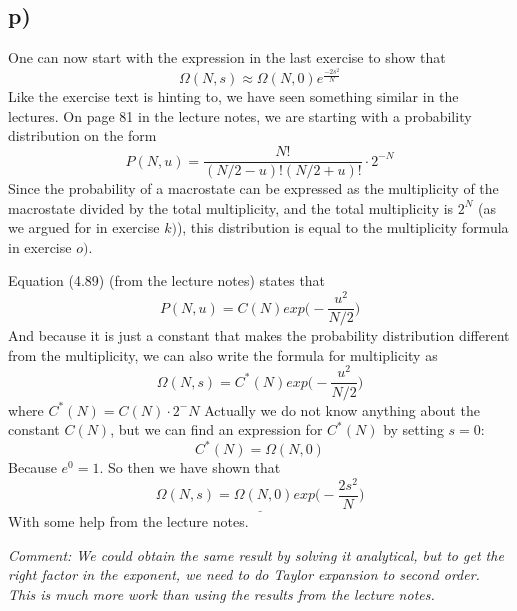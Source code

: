 \documentclass{scrartcl}
\begin{document}
\subsection*{p)}
One can now start with the expression in the last exercise to show that
$$\Omega(N,s)\approx\Omega(N,0)e^{\frac{-2s^2}{N}}$$
Like the exercise text is hinting to, we have seen something similar in the lectures. On page 81 in the lecture notes, we are starting with a probability distribution on the form
$$P(N,u)=\frac{N!}{(N/2-u)!(N/2+u)!}\cdot2^{-N}$$
Since the probability of a macrostate can be expressed as the multiplicity of the macrostate divided by the total multiplicity, and the total multiplicity is $2^N$ (as we argued for in exercise $k)$), this distribution is equal to the multiplicity formula in exercise $o)$.\par\vspace{3mm}
Equation (4.89) (from the lecture notes) states that 
$$P(N,u)=C(N)exp\bigg(-\frac{u^2}{N/2}\bigg)$$
And because it is just a constant that makes the probability distribution different from the multiplicity, we can also write the formula for multiplicity as
$$\Omega(N,s)=C^*(N)exp\bigg(-\frac{u^2}{N/2}\bigg)$$
where $C^*(N)=C(N)\cdot2^-N$
Actually we do not know anything about the constant $C(N)$, but we can find an expression for $C^*(N)$ by setting $s=0$:
$$C^*(N)=\Omega(N,0)$$
Because $e^0=1$. So then we have shown that 
$$\underline{\Omega(N,s)=\Omega(N,0)exp\bigg(-\frac{2s^2}{N}\bigg)}$$
With some help from the lecture notes.\par\vspace{3mm}
\textit{Comment: We could obtain the same result by solving it analytical, but to get the right factor in the exponent, we need to do Taylor expansion to second order. This is much more work than using the results from the lecture notes.} 
\newpage
\end{document}
